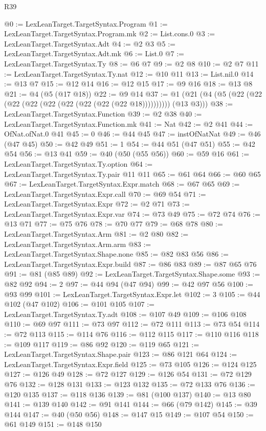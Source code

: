 \begin{lexlean}{R39}
\begin{coremodule}
@0 := LexLeanTarget.TargetSyntax.Program
@1 := LexLeanTarget.TargetSyntax.Program.mk
@2 := List.cons.{0}
@3 := LexLeanTarget.TargetSyntax.Adt
@4 := @2 @3
@5 := LexLeanTarget.TargetSyntax.Adt.mk
@6 := List.{0}
@7 := LexLeanTarget.TargetSyntax.Ty
@8 := @6 @7
@9 := @2 @8
@10 := @2 @7
@11 := LexLeanTarget.TargetSyntax.Ty.nat
@12 := @10 @11
@13 := List.nil.{0}
@14 := @13 @7
@15 := @12 @14
@16 := @12 @15
@17 := @9 @16
@18 := @13 @8
@21 := @4 (@5 (@17 @18))
@22 := @9 @14
@37 := @1 (@21 (@4 (@5 (@22 (@22 (@22 (@22 (@22 (@22 (@22 (@22 (@22 @18)))))))))) (@13 @3)))
@38 := LexLeanTarget.TargetSyntax.Function
@39 := @2 @38
@40 := LexLeanTarget.TargetSyntax.Function.mk
@41 := Nat
@42 := @2 @41
@44 := OfNat.ofNat.{0} @41
@45 := 0
@46 := @44 @45
@47 := instOfNatNat
@49 := @46 (@47 @45)
@50 := @42 @49
@51 := 1
@54 := @44 @51 (@47 @51)
@55 := @42 @54
@56 := @13 @41
@59 := @40 (@50 (@55 @56))
@60 := @59 @16
@61 := LexLeanTarget.TargetSyntax.Ty.option
@64 := LexLeanTarget.TargetSyntax.Ty.pair @11 @11
@65 := @61 @64
@66 := @60 @65
@67 := LexLeanTarget.TargetSyntax.Expr.match
@68 := @67 @65
@69 := LexLeanTarget.TargetSyntax.Expr.call
@70 := @69 @54
@71 := LexLeanTarget.TargetSyntax.Expr
@72 := @2 @71
@73 := LexLeanTarget.TargetSyntax.Expr.var
@74 := @73 @49
@75 := @72 @74
@76 := @13 @71
@77 := @75 @76
@78 := @70 @77
@79 := @68 @78
@80 := LexLeanTarget.TargetSyntax.Arm
@81 := @2 @80
@82 := LexLeanTarget.TargetSyntax.Arm.arm
@83 := LexLeanTarget.TargetSyntax.Shape.none
@85 := @82 @83 @56
@86 := LexLeanTarget.TargetSyntax.Expr.build
@87 := @86 @83
@89 := @87 @65 @76
@91 := @81 (@85 @89)
@92 := LexLeanTarget.TargetSyntax.Shape.some
@93 := @82 @92
@94 := 2
@97 := @44 @94 (@47 @94)
@99 := @42 @97 @56
@100 := @93 @99
@101 := LexLeanTarget.TargetSyntax.Expr.let
@102 := 3
@105 := @44 @102 (@47 @102)
@106 := @101 @105
@107 := LexLeanTarget.TargetSyntax.Ty.adt
@108 := @107 @49
@109 := @106 @108
@110 := @69 @97
@111 := @73 @97
@112 := @72 @111
@113 := @73 @54
@114 := @72 @113
@115 := @114 @76
@116 := @112 @115
@117 := @110 @116
@118 := @109 @117
@119 := @86 @92
@120 := @119 @65
@121 := LexLeanTarget.TargetSyntax.Shape.pair
@123 := @86 @121 @64
@124 := LexLeanTarget.TargetSyntax.Expr.field
@125 := @73 @105
@126 := @124 @125
@127 := @126 @49
@128 := @72 @127
@129 := @126 @54
@131 := @72 @129 @76
@132 := @128 @131
@133 := @123 @132
@135 := @72 @133 @76
@136 := @120 @135
@137 := @118 @136
@139 := @81 (@100 @137)
@140 := @13 @80
@141 := @139 @140
@142 := @91 @141
@144 := @66 (@79 @142)
@145 := @39 @144
@147 := @40 (@50 @56)
@148 := @147 @15
@149 := @107 @54
@150 := @61 @149
@151 := @148 @150

\end{coremodule}
\end{lexlean}
